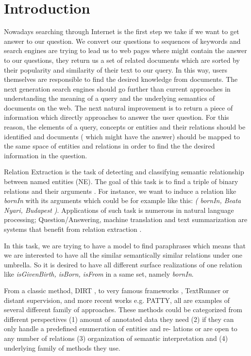 \chapter{Introduction}
Nowadays searching through Internet is the first step we take if we want to get answer to our question.
We convert our questions to sequences of keywords and search engines are trying 
to lead us to web pages where might contain the answer to our questions, they return us a set of related
documents which are sorted by their popularity and similarity of their text to our query.
In this way, users themselves are responsible to find the desired knowledge 
from documents. The next generation search engines should go further than current 
approaches in understanding the meaning of a query and the underlying semantics of documents on 
the web. The next natural improvement is to return a piece of information which directly approaches to 
answer the user question. For this reason, the elements of a query, concepts or entities and 
their relations should be identified and documents ( which might have the answer) should be mapped to the 
same space of entities and relations in order to find the the desired information in the question.


Relation Extraction is the task of detecting and classifying semantic relationship 
between named entities (NE). The goal of this task is to find a triple
of binary relations and their arguments \cite{Androutsopoulos2009}. For instance, we want to induce a
relation like \emph{bornIn} with its arguments which could be for example like this:\emph{ (
bornIn, Beata Nyari, Budapest )}. Applications of such task is numerous
in natural language processing; Question/Answering, machine translation and
text summarization are systems that benefit from relation extraction \cite{Androutsopoulos2009}.

In this task, we are trying to have a model to find paraphrases which means
that we are interested to have all the similar semantically similar relations under
one umbrella. So it is desired to have all different surface realizations of one
relation like \emph{isGivenBirth, isBorn, isFrom} in a same set, namely \emph{bornIn}.

From a classic method, DIRT \cite{Lin2001}, to very famous frameworks ,
TextRunner\cite{Bankoa} or distant supervision\cite{Mintz2009}, and more recent works e.g. PATTY\cite{Nakashole2012a},
all are examples of several different family of approaches. These methods could
be categorized from different perspectives (1) amount of annotated data they
need (2) if they can only handle a predefined enumeration of entities and re-
lations or are open to any number of relations (3) organization of semantic
interpretation and (4) underlying family of methods they use.


